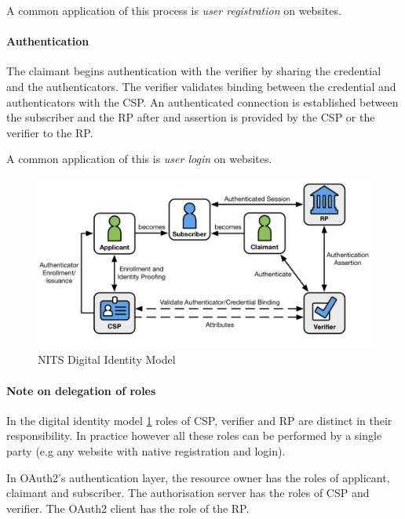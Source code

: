 A common application of this process is \textit{user registration} on websites.

\paragraph{Authentication} %

The claimant begins authentication with the verifier by sharing the credential and the authenticators. The verifier validates binding between the credential and authenticators with the CSP.
An authenticated connection is established between the subscriber and the RP after and assertion is provided by the CSP or the verifier to the RP.

A common application of this is \textit{user login} on websites.


\begin{figure}[h!]
	\centering
	\includegraphics[width=13cm]{images/NIST_digital_identity_model}
	\caption{NITS Digital Identity Model}
	\label{fig:NIST-digital-identity-model}
\end{figure}

\paragraph{Note on delegation of roles} %
In the digital identity model \ref{fig:NIST-digital-identity-model} roles of CSP, verifier and RP are distinct in their responsibility. 
In practice however all these roles can be performed by a single party (e.g any website with native registration and login).

In OAuth2's \cite{hardt2012oauth} authentication layer, the resource owner has the roles of applicant, claimant and subscriber. The authorisation server has the roles of CSP and verifier. The OAuth2 client has the role of the RP. %

